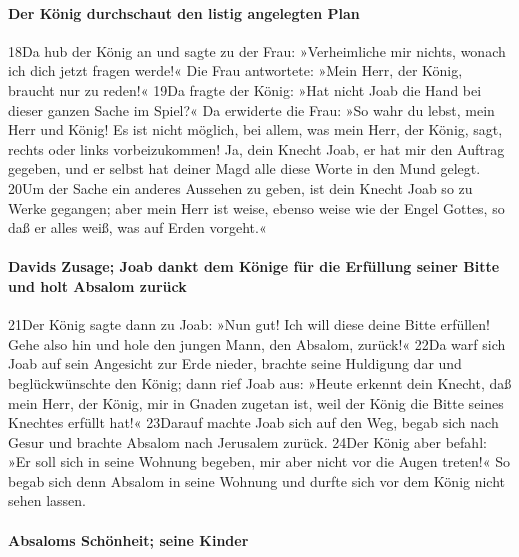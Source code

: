 \hypertarget{der-kuxf6nig-durchschaut-den-listig-angelegten-plan}{%
\paragraph{Der König durchschaut den listig angelegten
Plan}\label{der-kuxf6nig-durchschaut-den-listig-angelegten-plan}}

18Da hub der König an und sagte zu der Frau: »Verheimliche mir nichts,
wonach ich dich jetzt fragen werde!« Die Frau antwortete: »Mein Herr,
der König, braucht nur zu reden!« 19Da fragte der König: »Hat nicht Joab
die Hand bei dieser ganzen Sache im Spiel?« Da erwiderte die Frau: »So
wahr du lebst, mein Herr und König! Es ist nicht möglich, bei allem, was
mein Herr, der König, sagt, rechts oder links vorbeizukommen! Ja, dein
Knecht Joab, er hat mir den Auftrag gegeben, und er selbst hat deiner
Magd alle diese Worte in den Mund gelegt. 20Um der Sache ein anderes
Aussehen zu geben, ist dein Knecht Joab so zu Werke gegangen; aber mein
Herr ist weise, ebenso weise wie der Engel Gottes, so daß er alles weiß,
was auf Erden vorgeht.«

\hypertarget{davids-zusage-joab-dankt-dem-kuxf6nige-fuxfcr-die-erfuxfcllung-seiner-bitte-und-holt-absalom-zuruxfcck}{%
\paragraph{Davids Zusage; Joab dankt dem Könige für die Erfüllung seiner
Bitte und holt Absalom
zurück}\label{davids-zusage-joab-dankt-dem-kuxf6nige-fuxfcr-die-erfuxfcllung-seiner-bitte-und-holt-absalom-zuruxfcck}}

21Der König sagte dann zu Joab: »Nun gut! Ich will diese deine Bitte
erfüllen! Gehe also hin und hole den jungen Mann, den Absalom, zurück!«
22Da warf sich Joab auf sein Angesicht zur Erde nieder, brachte seine
Huldigung dar und beglückwünschte den König; dann rief Joab aus: »Heute
erkennt dein Knecht, daß mein Herr, der König, mir in Gnaden zugetan
ist, weil der König die Bitte seines Knechtes erfüllt hat!« 23Darauf
machte Joab sich auf den Weg, begab sich nach Gesur und brachte Absalom
nach Jerusalem zurück. 24Der König aber befahl: »Er soll sich in seine
Wohnung begeben, mir aber nicht vor die Augen treten!« So begab sich
denn Absalom in seine Wohnung und durfte sich vor dem König nicht sehen
lassen.

\hypertarget{absaloms-schuxf6nheit-seine-kinder}{%
\paragraph{Absaloms Schönheit; seine
Kinder}\label{absaloms-schuxf6nheit-seine-kinder}}

